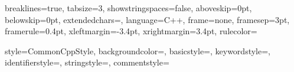 %
%

%


{
        breaklines=true,
        tabsize=3, 
        showstringspaces=false,
        aboveskip=0pt,
        belowskip=0pt, 
        extendedchars=\true,
        language=C++,
        frame=none,   
        framesep=3pt,%
        framerule=0.4pt,%
        xleftmargin=-3.4pt,%
        xrightmargin=3.4pt,%
        rulecolor=\color{Red}%
}

{
        style=CommonCppStyle,
        backgroundcolor=\color{Yellow!10},
        basicstyle=\scriptsize\color{Black}\ttfamily,
        keywordstyle=\color{Orange},
        identifierstyle=\color{Cyan},
        stringstyle=\color{Red}, 
        commentstyle=\color{Green} 
}

\newcommand{\IncludeCppCode}[2][style=ThemeCppA]
{
    
}


